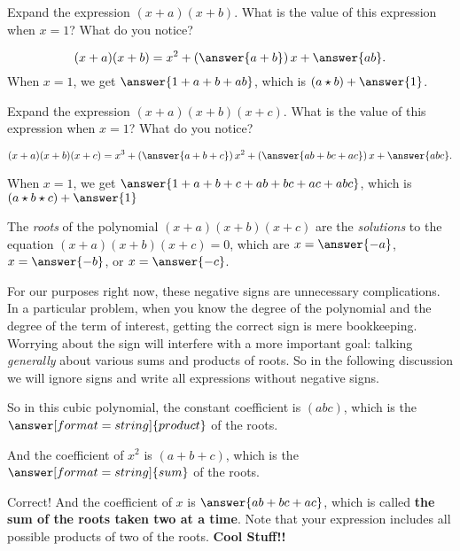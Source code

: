 \documentclass{ximera}
\begin{document}
\newpage 

\begin{problem}
Expand the expression $(x+a)(x+b)$.  What is the value of this expression when $x=1$?  What do you notice?

\begin{prompt}
\[
(x+a)(x+b) = x^2+ \left(\answer{a+b}\right)x+\answer{ab}.  
\]
When $x=1$, we get $\answer{1+a+b+ab}$, which is $(a\star b)+\answer{1}$.  
\end{prompt}

\end{problem}

\begin{problem}
Expand the expression $(x+a)(x+b)(x+c)$.  What is the value of this expression when $x=1$?  What do you notice?

\begin{prompt}
\[
(x+a)(x+b)(x+c) = x^3+ \left(\answer{a+b+c}\right)x^2+\left(\answer{ab+bc+ac}\right)x+\answer{abc}.  
\]

When $x=1$, we get $\answer{1+a+b+c+ab+bc+ac+abc}$, which is $(a\star b\star c)+\answer{1}$
\end{prompt}
\begin{problem}
The \emph{roots} of the polynomial $(x+a)(x+b)(x+c)$ are the \emph{solutions} to the equation $(x+a)(x+b)(x+c)=0$, which are 
$x=\answer{-a}$, $x=\answer{-b}$, or $x=\answer{-c}$.  

\begin{warning}
For our purposes right now, these negative signs are unnecessary complications.  In a particular problem, when you know the degree of the polynomial and the degree of the term of interest, getting the correct sign is mere bookkeeping.  Worrying about the sign will interfere with a more important goal: talking \emph{generally} about various sums and products of roots.  So in the following discussion we will ignore signs and write all expressions without negative signs.  
\end{warning}

\begin{problem}
So in this cubic polynomial, the constant coefficient is $(abc)$, which is the $\answer[format=string]{product}$ of the roots.  

And the coefficient of $x^2$ is $(a+b+c)$, which is the $\answer[format=string]{sum}$ of the roots.  

\begin{problem}
Correct!  And the coefficient of $x$ is $\answer{ab+bc+ac}$, which is called \textbf{the sum of the roots taken two at a time}.  Note that your expression includes all possible products of two of the roots.  \textbf{Cool Stuff!!}
\end{problem}
\end{problem}
\end{problem}
\end{problem}
\end{document}
